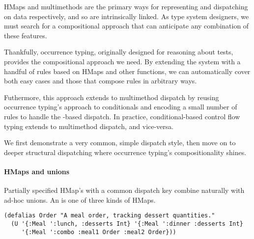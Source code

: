 HMaps and multimethods are the primary ways for representing
and dispatching on data respectively, and so are intrinsically linked.
As type system designers, we must
search for a compositional approach that can anticipate
any combination of these features.

Thankfully, occurrence typing, originally designed for reasoning about
 tests, provides the compositional approach we need.
By extending the system with
a handful of rules based on HMaps and other functions, 
we can automatically cover both easy cases and those
that compose rules in arbitrary ways.

Futhermore, this approach extends to multimethod dispatch by reusing
occurrence typing's approach to conditionals
and
encoding a small number of rules to handle
the -based dispatch.
In practice, conditional-based control flow typing
extends to multimethod dispatch, and vice-versa.

We first demonstrate a very common, simple dispatch style,
then move on to deeper structural dispatching where occurrence typing's
compositionality shines.

\paragraph{HMaps and unions} Partially specified HMap's with a common dispatch key
combine naturally with ad-hoc unions.
An  is one of three kinds of HMaps.


\begin{lstlisting}
(defalias Order "A meal order, tracking dessert quantities."
  (U '{:Meal ':lunch, :desserts Int} '{:Meal ':dinner :desserts Int}
     '{:Meal ':combo :meal1 Order :meal2 Order}))
\end{lstlisting}

